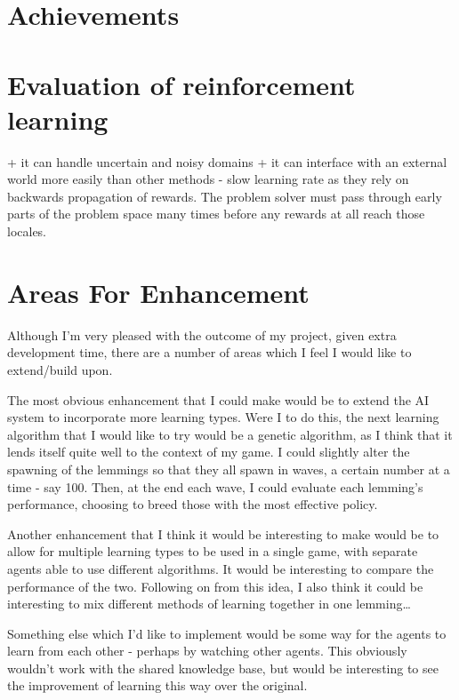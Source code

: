 \documentclass[a4paper,oneside]{report}
\begin{document}
\section{Achievements}

\section{Evaluation of reinforcement learning}

+ it can handle uncertain and noisy domains
+ it can interface with an external world more easily than other methods
- slow learning rate as they rely on backwards propagation of rewards. The problem solver must pass through early parts of the problem space many times before any rewards at all reach those locales.


\section{Areas For Enhancement}

Although I'm very pleased with the outcome of my project, given extra development time, there are a number of areas which I feel I would like to extend/build upon.

The most obvious enhancement that I could make would be to extend the AI system to incorporate more learning types. Were I to do this, the next learning algorithm that I would like to try would be a genetic algorithm, as I think that it lends itself quite well to the context of my game. I could slightly alter the spawning of the lemmings so that they all spawn in waves, a certain number at a time - say 100. Then, at the end each wave, I could evaluate each lemming's performance, choosing to breed those with the most effective policy.

Another enhancement that I think it would be interesting to make would be to allow for multiple learning types to be used in a single game, with separate agents able to use different algorithms. It would be interesting to compare the performance of the two. Following on from this idea, I also think it could be interesting to mix different methods of learning together in one lemming…

Something else which I'd like to implement would be some way for the agents to learn from each other - perhaps by watching other agents. This obviously wouldn't work with the shared knowledge base, but would be interesting to see the improvement of learning this way over the original.
\end{document}
